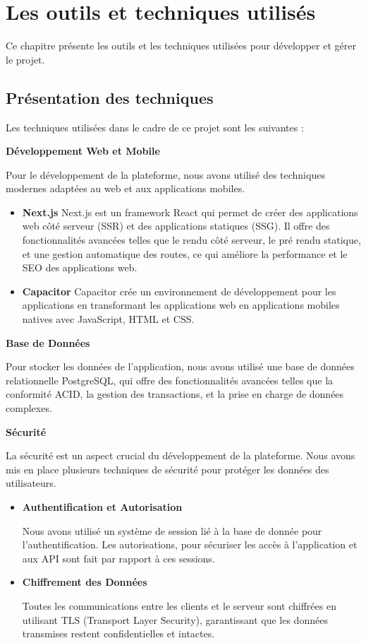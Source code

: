 \chapter{Les outils et techniques utilisés}
Ce chapitre présente les outils et les techniques utilisées pour développer
et gérer le projet.

\section{Présentation des techniques}
Les techniques utilisées dans le cadre de ce projet sont les suivantes :

  \textbf{ {Développement Web et Mobile}}

    Pour le développement de la plateforme, nous avons utilisé des techniques
    modernes adaptées au web et aux applications mobiles.
    \begin {itemize}
  \item \textbf{{Next.js}}
    Next.js est un framework React qui permet de créer des applications web côté
    serveur (SSR) et des applications statiques (SSG). Il offre des fonctionnalités
    avancées telles que le rendu côté serveur, le pré rendu statique, et une
    gestion automatique des routes, ce qui améliore la performance et le
    SEO des applications web.

  \item \textbf{{Capacitor}}
    Capacitor crée un environnement de développement pour les applications en
    transformant les applications web en applications mobiles natives avec
    JavaScript, HTML et CSS.

\end{itemize}

\textbf{{Base de Données}}

  Pour stocker les données de l'application, nous avons utilisé une base de
  données relationnelle PostgreSQL, qui offre des fonctionnalités avancées
  telles que la conformité ACID, la gestion des transactions, et la prise en
  charge de données complexes.

\textbf{{Sécurité}}

  La sécurité est un aspect crucial du développement de la plateforme. Nous
  avons mis en place plusieurs techniques de sécurité pour protéger les données
  des utilisateurs.
  \begin{itemize}
    \item \textbf{{Authentification et Autorisation}}

      Nous avons utilisé un système de session lié à la base de donnée pour
      l'authentification. Les autorisations, pour sécuriser les accès
      à l'application et aux API sont fait par rapport à ces sessions.

    \item \textbf{{Chiffrement des Données}}

      Toutes les communications entre les clients et le serveur sont chiffrées
      en utilisant TLS (Transport Layer Security), garantissant que les données
      transmises restent confidentielles et intactes.
  \end{itemize}

